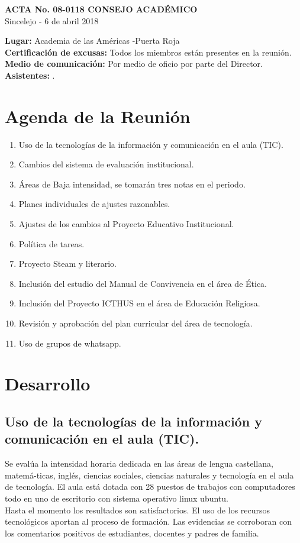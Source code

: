 \documentclass[12pt, letterpaper]{article} %
\def \acta {ACTA No. 08-0118 CONSEJO ACADÉMICO} %
\begin{document}
\begin{center}
\textbf{\acta{}} \\
Sincelejo - 6 de abril 2018
\end{center}

\textbf{Lugar:} Academia de las Américas -Puerta Roja \\
\textbf{Certificación de excusas:} Todos los miembros están presentes en la reunión. \\
\textbf{Medio de comunicación:} Por medio de oficio por parte del Director.\\
\textbf{Asistentes:} .\\
\section{Agenda de la Reunión}
\begin{enumerate}
  \item Uso de la tecnologías de la información y comunicación en el aula (TIC).
  \item Cambios del sistema de evaluación institucional.
  \item Áreas de Baja intensidad, se tomarán tres notas en el periodo.
\item Planes individuales de ajustes razonables.
\item Ajustes de los cambios al Proyecto Educativo Institucional.
\item Política de tareas.
\item Proyecto Steam y literario.
\item Inclusión del estudio del Manual de Convivencia en el área de Ética.
\item Inclusión del Proyecto ICTHUS en el área de Educación Religiosa.
\item Revisión y aprobación del plan curricular del área de tecnología.
\item Uso de grupos de whatsapp.
\end{enumerate}

\section{Desarrollo}
\subsection{Uso de la tecnologías de la información y comunicación en el aula (TIC).} Se evalúa la intensidad horaria dedicada en las áreas de lengua castellana, matemá-ticas, inglés, ciencias sociales, ciencias naturales y tecnología en el aula de tecnología. El aula está dotada con 28 puestos de trabajos con computadores todo en uno de escritorio con sistema operativo linux ubuntu. \\ Hasta el momento los resultados son satisfactorios. El uso de los recursos tecnológicos aportan al proceso de formación. Las evidencias se corroboran con los comentarios positivos de estudiantes, docentes y padres de familia.
\end{document}
